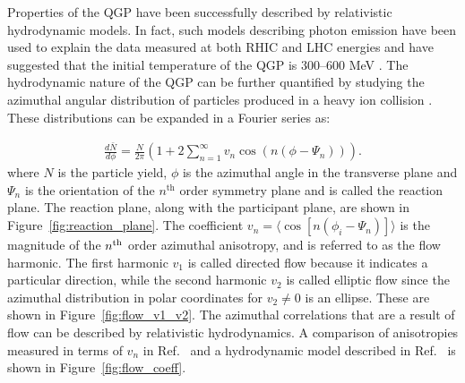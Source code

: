 Properties of the QGP have been successfully described by relativistic hydrodynamic models. 
In fact, such models describing photon emission have been used to explain the data measured at both RHIC \cite{PhysRevLett.104.132301} and LHC \cite{2016235} energies and have suggested that the initial temperature of the QGP is 300--600 MeV \cite{PhysRevC.81.034911}.
The hydrodynamic nature of the QGP can be further quantified by studying the azimuthal angular distribution of particles produced in a heavy ion collision \cite{Poskanzer:1998yz, Teaney:2001av, HIRANO2006299}.
These distributions can be expanded in a Fourier series as: 

\begin{align}
\frac{d\bar{N}}{d\phi} = \frac{N}{2\pi} \left( 1 + 2 \sum_{n=1}^{\infty} v_{n} \cos(n(\phi-\Psi_n)) \right).
\end{align}
where  $N$ is the particle yield, $\phi$ is the azimuthal angle in the transverse plane and $\Psi_n$ is the orientation of the $n^{\mathrm{th}}$ order symmetry plane and is called the reaction plane.
The reaction plane, along with the participant plane, are shown in Figure~\ref{fig:reaction_plane}.
The coefficient $v_n = \langle \cos[n(\phi_i - \Psi_n)] \rangle$ is the magnitude of the $n^{\rm{th}}$ order azimuthal anisotropy, and is referred to as the flow harmonic.
The first harmonic $v_1$ is called directed flow because it indicates a particular direction, while the second harmonic $v_2$ is called elliptic flow since the azimuthal distribution in polar coordinates for $v_2 \neq 0$ is an ellipse.
These are shown in Figure~\ref{fig:flow_v1_v2}.
The azimuthal correlations that are a result of flow can be described by relativistic hydrodynamics.
A comparison of anisotropies measured in terms of $v_n$ in Ref.~\cite{ALICE:2011ab} and a hydrodynamic model described in Ref.~\cite{Niemi:2015qia} is shown in Figure~\ref{fig:flow_coeff}.



